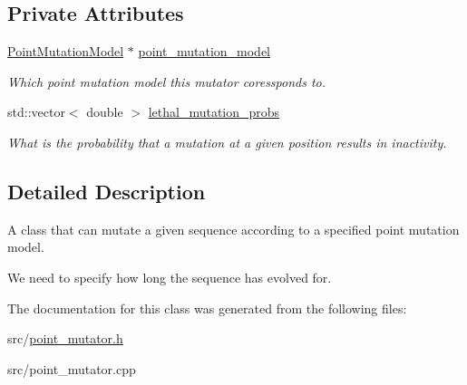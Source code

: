 \subsection*{Private Attributes}
\begin{DoxyCompactItemize}
\item 
\mbox{\label{classrcombinator_1_1PointMutator_a2e6661ed12c29646de00485b10bd8c74}} 
\mbox{\hyperlink{classrcombinator_1_1PointMutationModel}{Point\+Mutation\+Model}} $\ast$ \mbox{\hyperlink{classrcombinator_1_1PointMutator_a2e6661ed12c29646de00485b10bd8c74}{point\+\_\+mutation\+\_\+model}}
\begin{DoxyCompactList}\small\item\em Which point mutation model this mutator coressponds to. \end{DoxyCompactList}\item 
\mbox{\label{classrcombinator_1_1PointMutator_a0c3e0e7165db72541b331246603d545b}} 
std\+::vector$<$ double $>$ \mbox{\hyperlink{classrcombinator_1_1PointMutator_a0c3e0e7165db72541b331246603d545b}{lethal\+\_\+mutation\+\_\+probs}}
\begin{DoxyCompactList}\small\item\em What is the probability that a mutation at a given position results in inactivity. \end{DoxyCompactList}\end{DoxyCompactItemize}


\subsection{Detailed Description}
A class that can mutate a given sequence according to a specified point mutation model. 

We need to specify how long the sequence has evolved for. 

The documentation for this class was generated from the following files\+:\begin{DoxyCompactItemize}
\item 
src/\mbox{\hyperlink{point__mutator_8h}{point\+\_\+mutator.\+h}}\item 
src/point\+\_\+mutator.\+cpp\end{DoxyCompactItemize}
